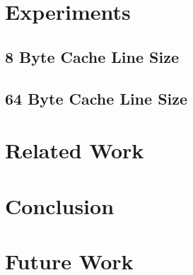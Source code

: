 \documentclass[onecolumn, openany, master, english, seal, signatures]{dbrgrptt}
\begin{document}
\chapter{Experiments}\label{cha:experimetns}
\section{8 Byte Cache Line Size}
\section{64 Byte Cache Line Size}


\chapter{Related Work}\label{cha:related-work}

\chapter{Conclusion}\label{cha:conclusion}

\chapter{Future Work}\label{cha:future-work}



\end{document}
